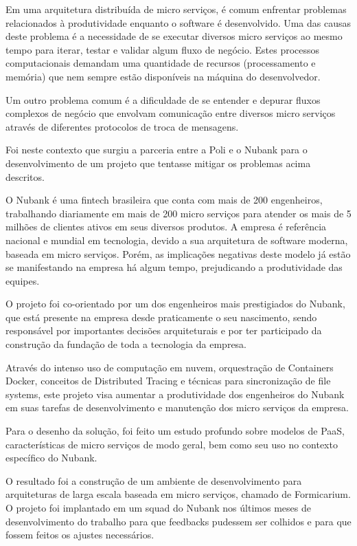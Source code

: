 \documentclass[]{politex}
\begin{document}
\begin{resumo}
	Em uma arquitetura distribuída de micro serviços, é comum enfrentar problemas relacionados à produtividade enquanto o software é desenvolvido. Uma das causas deste problema é a necessidade de se executar diversos micro serviços ao mesmo tempo para iterar, testar e validar algum fluxo de negócio. Estes processos computacionais demandam uma quantidade de recursos (processamento e memória) que nem sempre estão disponíveis na máquina do desenvolvedor.
	
	Um outro problema comum é a dificuldade de se entender e depurar fluxos complexos de negócio que envolvam comunicação entre diversos micro serviços através de diferentes protocolos de troca de mensagens.
	
	Foi neste contexto que surgiu a parceria entre a Poli e o Nubank para o desenvolvimento de um projeto que tentasse mitigar os problemas acima descritos.
	
	O Nubank é uma fintech brasileira que conta com mais de 200 engenheiros, trabalhando diariamente em mais de 200 micro serviços para atender os mais de 5 milhões de clientes ativos em seus diversos produtos. A empresa é referência nacional e mundial em tecnologia, devido a sua arquitetura de software moderna, baseada em micro serviços. Porém, as implicações negativas deste modelo já estão se manifestando na empresa há algum tempo, prejudicando a produtividade das equipes.
	
	O projeto foi co-orientado por um dos engenheiros mais prestigiados do Nubank, que está presente na empresa desde praticamente o seu nascimento, sendo responsável por importantes decisões arquiteturais e por ter participado da construção da fundação de toda a tecnologia da empresa.
	
	Através do intenso uso de computação em nuvem, orquestração de Containers Docker, conceitos de Distributed Tracing e técnicas para sincronização de file systems, este projeto visa aumentar a produtividade dos engenheiros do Nubank em suas tarefas de desenvolvimento e manutenção dos micro serviços da empresa.
	
	Para o desenho da solução, foi feito um estudo profundo sobre modelos de PaaS, características de micro serviços de modo geral, bem como seu uso no contexto específico do Nubank. 
	
	O resultado foi a construção de um ambiente de desenvolvimento para arquiteturas de larga escala baseada em micro serviços, chamado de Formicarium. O projeto foi implantado em um squad do Nubank nos últimos meses de desenvolvimento do trabalho para que feedbacks pudessem ser colhidos e para que fossem feitos os ajustes necessários.
	

\end{resumo}
\end{document}
